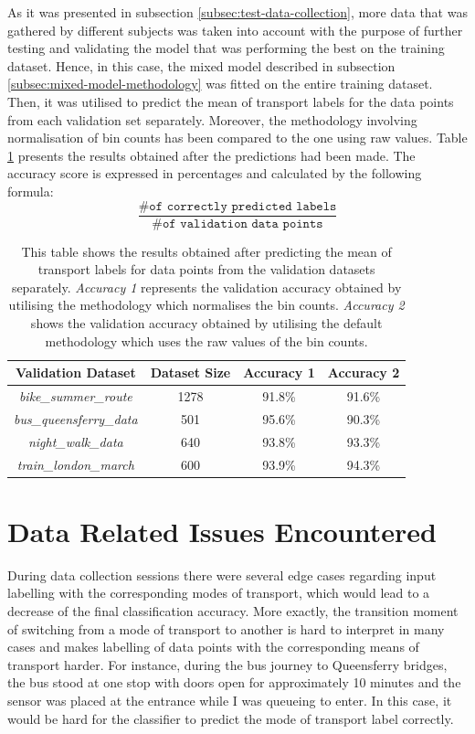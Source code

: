 \documentclass[bsc,frontabs,twoside,singlespacing, parskip,deptreport]{infthesis}     %
\begin{document}
As it was presented in subsection \ref{subsec:test-data-collection}, more data that was gathered by different subjects was taken into account with the purpose of further testing and validating the model that was performing the best on the training dataset. Hence, in this case, the mixed model described in subsection \ref{subsec:mixed-model-methodology} was fitted on the entire training dataset. Then, it was utilised to predict the mean of transport labels for the data points from each validation set separately. Moreover, the methodology involving normalisation of bin counts has been compared to the one using raw values. Table \ref{table:validation-results} presents the results obtained after the predictions had been made. The accuracy score is expressed in percentages and calculated by the following formula: $$ \frac{\texttt{\# of correctly predicted labels}}{\texttt{\# of validation data points}} $$

\begin{table}[h!]
\centering
 \begin{tabular}{|| c | c | c | c ||} 
 \hline
 Validation Dataset & Dataset Size & Accuracy 1 & Accuracy 2 \\ [0.5ex] 
 \hline\hline
 \textit{bike\_summer\_route} & 1278 &  91.8\% & 91.6\% \\ 
 \hline
 \textit{bus\_queensferry\_data} & 501 & 95.6\% & 90.3\% \\ 
 \hline
 \textit{night\_walk\_data} & 640 & 93.8\% & 93.3\% \\
 \hline
 \textit{train\_london\_march} & 600 & 93.9\% & 94.3\% \\ 
 \hline
\end{tabular}
\caption{This table shows the results obtained after predicting the mean of transport labels for data points from the validation datasets separately. \textit{Accuracy 1} represents the validation accuracy obtained by utilising the methodology which normalises the bin counts. \textit{Accuracy 2} shows the validation accuracy obtained by utilising the default methodology which uses the raw values of the bin counts.}
\label{table:validation-results}
\end{table}

\section{Data Related Issues Encountered}

During data collection sessions there were several edge cases regarding input labelling with the corresponding modes of transport, which would lead to a decrease of the final classification accuracy. More exactly, the transition moment of switching from a mode of transport to another is hard to interpret in many cases and makes labelling of data points with the corresponding means of transport harder. For instance, during the bus journey to Queensferry bridges, the bus stood at one stop with doors open for approximately 10 minutes and the sensor was placed at the entrance while I was queueing to enter. In this case, it would be hard for the classifier to predict the mode of transport label correctly. 
\end{document}
